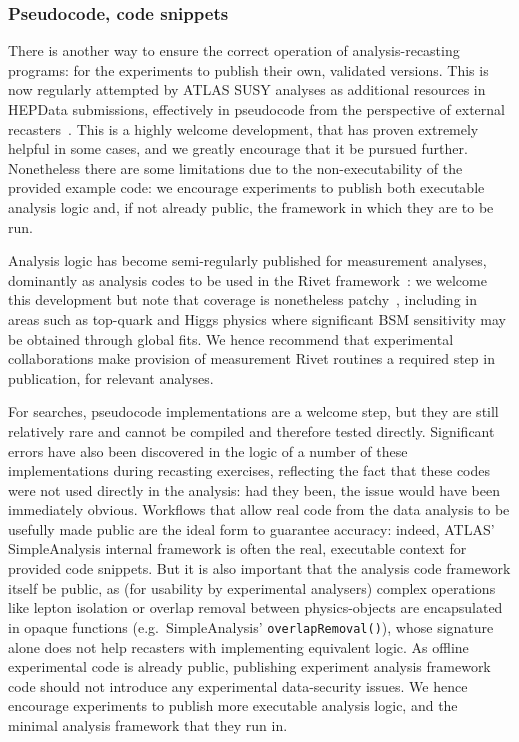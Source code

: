 \documentclass[a4paper,aps,prd,longbibliography,notitlepage,showpacs,amsmath,amssymb,superscriptaddress,nofootinbib,floatfix,11pt,preprintnumbers]{revtex4-1-mod}
\newcommand{\kbd}[1]{\texttt{#1}}
\newcommand{\hepdata}{\textsf{HEPData}\xspace}
\newcommand{\rivet}{\textsf{Rivet}\xspace}
\newcommand{\eg}{e.g.\xspace}
\begin{document}
\subsubsection{Pseudocode, code snippets}

There is another way to ensure the correct operation of analysis-recasting programs: for the experiments to publish their own, validated versions. This is now regularly attempted by ATLAS SUSY analyses as additional resources in \hepdata submissions, effectively in pseudocode from the perspective of external recasters~\cite{Aaboud:2018hdl,Aaboud:2018mna,Aaboud:2018ngk,Aaboud:2019trc,Aad:2019pfy,Aad:2019vvf,Aad:2019byo}.
This is a highly welcome development, that has proven extremely helpful in some cases, and we greatly encourage that it be pursued further. Nonetheless there are
some limitations due to the non-executability of the provided example code: we encourage experiments to publish both executable analysis logic and, if not already public, the framework in which they are to be run.

Analysis logic has become semi-regularly published for measurement analyses, dominantly as analysis codes to be used in the \rivet framework~\cite{Buckley:2010ar,Bierlich:2019rhm}: we welcome this development but note that coverage is nonetheless patchy~\cite{rivetcoverage}, including in areas such as top-quark and Higgs physics where significant BSM sensitivity may be obtained through global fits. We hence recommend that experimental collaborations make provision of measurement \rivet routines a required step in publication, for relevant analyses.

For searches, pseudocode implementations are a welcome step, but they are still relatively rare and cannot be compiled and therefore tested directly.  Significant errors have also been discovered in the logic of a number of these implementations during recasting exercises, reflecting the fact that these codes were not used directly in the analysis: had they been, the issue would have been immediately obvious.  Workflows that allow real code from the data analysis to be usefully made public are the ideal form to guarantee accuracy: indeed, ATLAS' \textsf{SimpleAnalysis} internal framework is often the real, executable context for provided code snippets. But it is also important that the analysis code framework itself be public, as (for usability by experimental analysers) complex operations like lepton isolation or overlap removal between physics-objects are encapsulated in opaque functions (\eg~\textsf{SimpleAnalysis}' \kbd{overlapRemoval()}), whose signature alone does not help recasters with implementing equivalent logic. As offline experimental code is already public, publishing experiment analysis framework code should not introduce any experimental data-security issues.  We hence encourage experiments to publish more executable analysis logic, and the minimal analysis framework that they run in.
\end{document}
